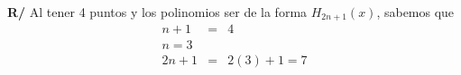 \documentclass[12pt]{article}
\begin{document}
\begin{enumerate}[leftmargin=*,widest=9]
\begin{enumerate}[label=\alph*]
\textbf{R/} Al tener 4 puntos y los polinomios ser de la forma \(H_{2n+1}(x)\), sabemos que
	\begin{eqnarray*}
	n + 1 &=& 4\\
	n = 3 \\
	2n + 1 &=& 2(3)+1 = 7
\end{eqnarray*}
    \end{enumerate}
\end{enumerate}
\end{document}
